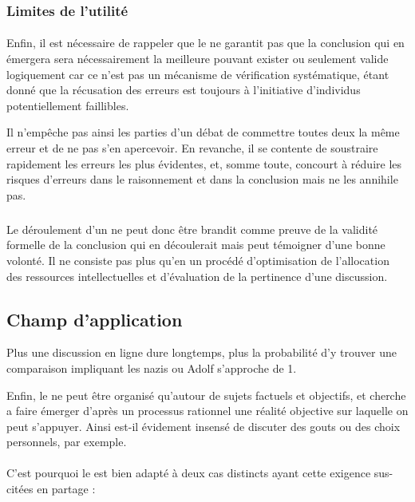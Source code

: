 \subsubsection{Limites de l’utilité}
\paragraph{}
Enfin, il est nécessaire de rappeler que le \mainabbr{} ne garantit pas que la conclusion qui en émergera sera nécessairement la meilleure pouvant exister ou seulement valide logiquement car ce n’est pas un mécanisme de vérification systématique, étant donné que la récusation des erreurs est toujours à l’initiative d’individus potentiellement faillibles.

Il n’empêche pas ainsi les parties d’un débat de commettre toutes deux la même erreur et de ne pas s’en apercevoir. En revanche, il se contente de soustraire rapidement les erreurs les plus évidentes, et, somme toute, concourt à réduire les risques d’erreurs dans le raisonnement et dans la conclusion mais ne les annihile pas.

\subparagraph{}
Le déroulement d’un \mainabbr{} ne peut donc être brandit comme preuve de la validité formelle de la conclusion qui en découlerait mais peut témoigner d’une bonne volonté. Il ne consiste pas plus qu’en un procédé d’optimisation de l’allocation des ressources intellectuelles et d’évaluation de la pertinence d’une discussion.

\subsection{Champ d’application}
\epigraph{Plus une discussion en ligne dure longtemps, plus la probabilité d’y trouver une comparaison impliquant les nazis ou Adolf  s’approche de 1.}{}
Enfin, le \mainabbr{} ne peut être organisé qu’autour de sujets factuels et objectifs, et cherche a faire émerger d’après un processus rationnel une réalité objective sur laquelle on peut s’appuyer. Ainsi est-il évidement insensé de discuter des gouts ou des choix personnels, par exemple.

\paragraph*{}
C’est pourquoi le \mainabbr{} est bien adapté à deux cas distincts ayant cette exigence sus-citées en partage :

